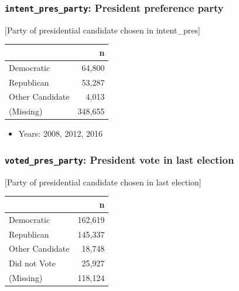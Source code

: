 \documentclass[10pt,article,oneside]{memoir}
\theoremstyle{definition}
\begin{document}
\hypertarget{intent_pres_party-president-preference-party}{%
\subsubsection{\texorpdfstring{\texttt{intent\_pres\_party}: President
preference
party}{intent\_pres\_party: President preference party}}\label{intent_pres_party-president-preference-party}}

{[}Party of presidential candidate chosen in intent\_pres{]}

\begin{table}[H]
\centering
\begin{tabular}{lr}
\toprule
 & n\\
\midrule
Democratic & 64,800\\
Republican & 53,287\\
Other Candidate & 4,013\\
(Missing) & 348,655\\
\bottomrule
\end{tabular}
\end{table}

\begin{itemize}
\tightlist
\item
  Years: 2008, 2012, 2016
\end{itemize}

\hypertarget{voted_pres_party-president-vote-in-last-election}{%
\subsubsection{\texorpdfstring{\texttt{voted\_pres\_party}: President
vote in last
election}{voted\_pres\_party: President vote in last election}}\label{voted_pres_party-president-vote-in-last-election}}

{[}Party of presidential candidate chosen in last election{]}

\begin{table}[H]
\centering
\begin{tabular}{lr}
\toprule
 & n\\
\midrule
Democratic & 162,619\\
Republican & 145,337\\
Other Candidate & 18,748\\
Did not Vote & 25,927\\
(Missing) & 118,124\\
\bottomrule
\end{tabular}
\end{table}
\end{document}
